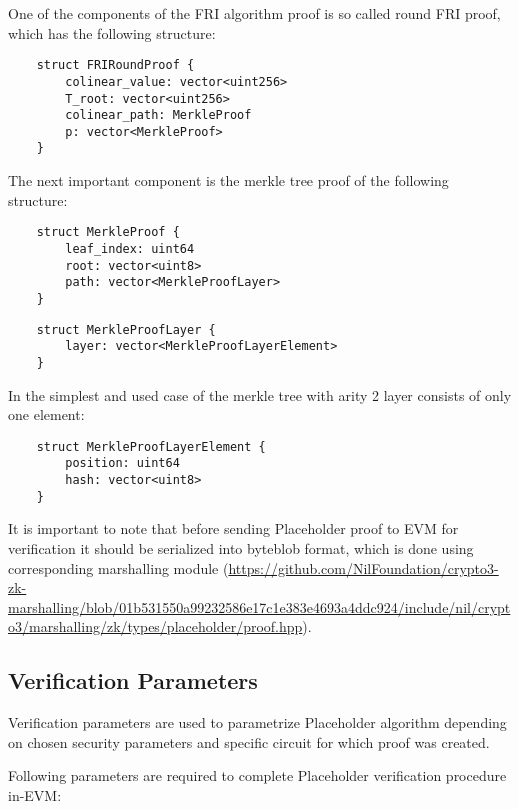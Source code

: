 One of the components of the FRI algorithm proof is so called round FRI proof, which has the following structure:

\begin{verbatim}
    struct FRIRoundProof {
        colinear_value: vector<uint256>
        T_root: vector<uint256>
        colinear_path: MerkleProof
        p: vector<MerkleProof>
    }
\end{verbatim}

The next important component is the merkle tree proof of the following structure:

\begin{verbatim}
    struct MerkleProof {
        leaf_index: uint64
        root: vector<uint8>
        path: vector<MerkleProofLayer>
    }
\end{verbatim}

\begin{verbatim}
    struct MerkleProofLayer {
        layer: vector<MerkleProofLayerElement>
    }       
\end{verbatim}

In the simplest and used case of the merkle tree with arity 2 layer consists of only one element:

\begin{verbatim}
    struct MerkleProofLayerElement {
        position: uint64
        hash: vector<uint8>
    }
\end{verbatim}

It is important to note that before sending Placeholder proof to EVM for verification it should be serialized into byteblob format,
which is done using corresponding marshalling module 
(\url{https://github.com/NilFoundation/crypto3-zk-marshalling/blob/01b531550a99232586e17c1e383e4693a4ddc924/include/nil/crypto3/marshalling/zk/types/placeholder/proof.hpp}).

\subsection{Verification Parameters}

Verification parameters are used to parametrize Placeholder algorithm depending on chosen security parameters and specific circuit for which proof was created.

Following parameters are required to complete Placeholder verification procedure in-EVM:

